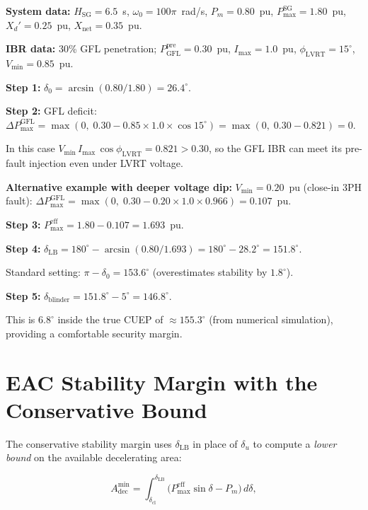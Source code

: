 \documentclass[11pt,a4paper]{article}
\newcommand{\dz}{\delta_0}         %
\newcommand{\du}{\delta_u}         %
\newcommand{\dlb}{\delta_{\mathrm{LB}}}   %
\newcommand{\dcl}{\delta_{\mathrm{cl}}}   %
\newcommand{\Pm}{P_m}
\newcommand{\PmaxSG}{P_{\max}^{\mathrm{SG}}}
\newcommand{\PmaxEff}{P_{\max}^{\mathrm{eff}}}
\newcommand{\Hsg}{H_{\mathrm{SG}}}
\newcommand{\omegaz}{\omega_0}
\newcommand{\Adec}{A_{\mathrm{dec}}}
\begin{document}
\textbf{System data:} $\Hsg = 6.5$~s, $\omegaz = 100\pi$~rad/s,
$\Pm = 0.80$~pu, $\PmaxSG = 1.80$~pu, $X_d' = 0.25$~pu,
$X_{\mathrm{net}} = 0.35$~pu.

\textbf{IBR data:} 30\% GFL penetration;
$P_{\mathrm{GFL}}^{\mathrm{pre}} = 0.30$~pu,
$I_{\max} = 1.0$~pu, $\phi_{\mathrm{LVRT}} = 15^\circ$,
$V_{\min} = 0.85$~pu.

\textbf{Step 1:} $\dz = \arcsin(0.80/1.80) = 26.4^\circ$.

\textbf{Step 2:} GFL deficit:
$\Delta P_{\max}^{\mathrm{GFL}} = \max(0,\; 0.30 - 0.85\times1.0\times\cos15^\circ)
= \max(0,\; 0.30 - 0.821) = 0$.

In this case $V_{\min}\,I_{\max}\,\cos\phi_{\mathrm{LVRT}} = 0.821 > 0.30$,
so the GFL IBR can meet its pre-fault injection even under LVRT voltage.

\textbf{Alternative example with deeper voltage dip:}
$V_{\min} = 0.20$~pu (close-in 3PH fault):
$\Delta P_{\max}^{\mathrm{GFL}} = \max(0,\; 0.30 - 0.20\times1.0\times0.966) = 0.107$~pu.

\textbf{Step 3:} $\PmaxEff = 1.80 - 0.107 = 1.693$~pu.

\textbf{Step 4:}
$\dlb = 180^\circ - \arcsin(0.80/1.693) = 180^\circ - 28.2^\circ = \mathbf{151.8^\circ}$.

Standard setting: $\pi - \dz = 153.6^\circ$ (overestimates stability by $1.8^\circ$).

\textbf{Step 5:} $\delta_{\mathrm{blinder}} = 151.8^\circ - 5^\circ = \mathbf{146.8^\circ}$.

This is $6.8^\circ$ inside the true CUEP of $\approx 155.3^\circ$ (from
numerical simulation), providing a comfortable security margin.

\section{EAC Stability Margin with the Conservative Bound}
\label{sec:margin}

The conservative stability margin uses $\dlb$ in place of $\du$ to compute a
\emph{lower bound} on the available decelerating area:

\begin{equation}
  \Adec^{\min} = \int_{\dcl}^{\dlb}
    \bigl(\PmaxEff\sin\delta - \Pm\bigr)\,d\delta,
  \label{eq:Adec_min}
\end{equation}
\end{document}
